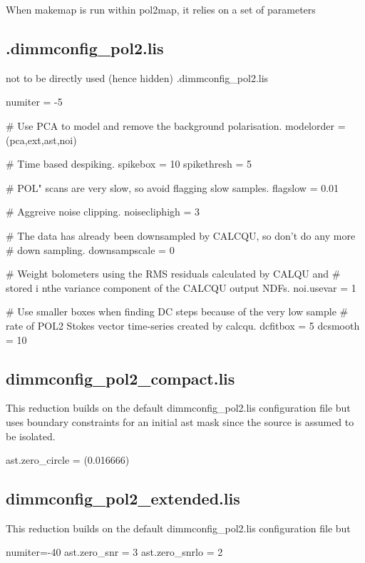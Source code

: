 When makemap is run within pol2map, it relies on a set of parameters

\subsection*{.dimmconfig\_pol2.lis}

not to be directly used (hence hidden) .dimmconfig\_pol2.lis

numiter = -5




\begin{terminalv}
#  Use PCA to model and remove the  background polarisation.
   modelorder = (pca,ext,ast,noi)

#  Time based despiking.
   spikebox = 10
   spikethresh = 5

#  POL" scans are very slow, so avoid flagging slow samples.
   flagslow = 0.01

#  Aggreive noise clipping.
   noisecliphigh = 3

#  The data has already been downsampled by CALCQU, so don't  do any more
#  down sampling.
   downsampscale = 0

#  Weight bolometers using the RMS residuals calculated by CALQU and
#  stored i nthe variance component of the CALCQU output NDFs.
   noi.usevar = 1

#  Use smaller boxes when finding DC steps because of the very low sample
#  rate of POL2 Stokes vector time-series created by calcqu.
   dcfitbox = 5
   dcsmooth = 10
\end{terminalv}


\subsection*{dimmconfig\_pol2\_compact.lis}

This reduction builds on the default dimmconfig\_pol2.lis configuration file but uses boundary
constraints for an initial ast mask since the source is assumed to be isolated.


\begin{terminalv}
   ast.zero_circle = (0.016666)
\end{terminalv}


\subsection*{dimmconfig\_pol2\_extended.lis}


This reduction builds on the default dimmconfig\_pol2.lis configuration file but

\begin{terminalv}
   numiter=-40
   ast.zero_snr = 3
   ast.zero_snrlo = 2
\end{terminalv}








